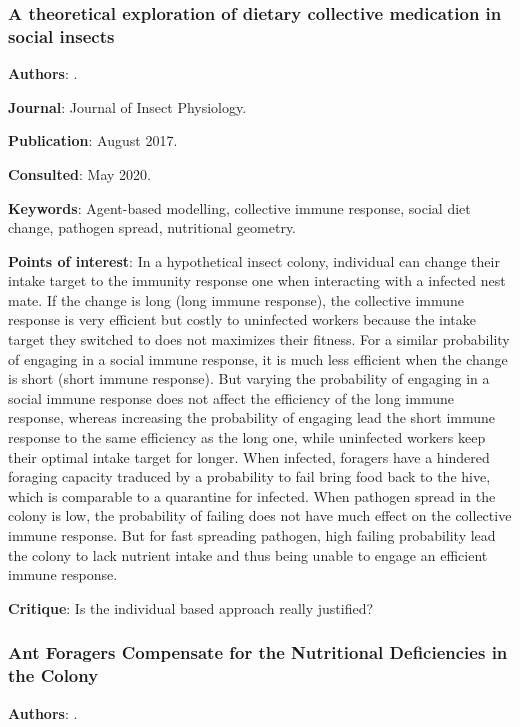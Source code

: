\documentclass[12pt,a4paper]{article}
\begin{document}
\subsubsection*{A theoretical exploration of dietary collective medication in social insects}

\textbf{Authors}: \cite{POISSONNIER201878}.

\textbf{Journal}: Journal of Insect Physiology.

\textbf{Publication}: August 2017.

\textbf{Consulted}: May 2020.

\textbf{Keywords}: Agent-based modelling, collective immune response, social diet change, pathogen spread, nutritional geometry.

\textbf{Points of interest}: In a hypothetical insect colony, individual can change their intake target to the immunity response one when interacting with a infected nest mate. If the change is long (long immune response), the collective immune response is very efficient but costly to uninfected workers because the intake target they switched to does not maximizes their fitness. For a similar probability of engaging in a social immune response, it is much less efficient when the change is short (short immune response). But varying the probability of engaging in a social immune response does not affect the efficiency of the long immune response, whereas increasing the probability of engaging lead the short immune response to the same efficiency as the long one, while uninfected workers keep their optimal intake target for longer.
When infected, foragers have a hindered foraging capacity traduced by a probability to fail bring food back to the hive, which is comparable to a quarantine for infected. When pathogen spread in the colony is low, the probability of failing does not have much effect on the collective immune response. But for fast spreading pathogen, high failing probability lead the colony to lack nutrient intake and thus being unable to engage an efficient immune response.

\textbf{Critique}: Is the individual based approach really justified? 

\newpage

\subsubsection*{Ant Foragers Compensate for the Nutritional Deficiencies in the Colony}

\textbf{Authors}: \cite{csata2020ant}.
\end{document}
